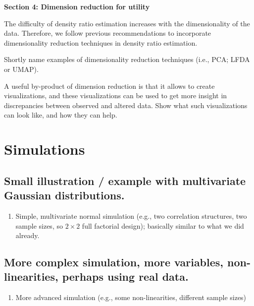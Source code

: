 \documentclass[
]{article}
\providecommand{\tightlist}{%
  \setlength{\itemsep}{0pt}\setlength{\parskip}{0pt}}\usepackage{longtable,booktabs,array}
\begin{document}
\textbf{Section 4: Dimension reduction for utility}

The difficulty of density ratio estimation increases with the
dimensionality of the data. Therefore, we follow previous
recommendations to incorporate dimensionality reduction techniques in
density ratio estimation.

Shortly name examples of dimensionality reduction techniques (i.e., PCA;
LFDA or UMAP).

A useful by-product of dimension reduction is that it allows to create
visualizations, and these visualizations can be used to get more insight
in discrepancies between observed and altered data. Show what such
visualizations can look like, and how they can help.

\hypertarget{simulations}{%
\section{Simulations}\label{simulations}}

\hypertarget{small-illustration-example-with-multivariate-gaussian-distributions.}{%
\subsection{Small illustration / example with multivariate Gaussian
distributions.}\label{small-illustration-example-with-multivariate-gaussian-distributions.}}

\begin{enumerate}
\def\labelenumi{\arabic{enumi}.}
\tightlist
\item
  Simple, multivariate normal simulation (e.g., two correlation
  structures, two sample sizes, so \(2 \times 2\) full factorial
  design); basically similar to what we did already.
\end{enumerate}

\hypertarget{more-complex-simulation-more-variables-non-linearities-perhaps-using-real-data.}{%
\subsection{More complex simulation, more variables, non-linearities,
perhaps using real
data.}\label{more-complex-simulation-more-variables-non-linearities-perhaps-using-real-data.}}

\begin{enumerate}
\def\labelenumi{\arabic{enumi}.}
\setcounter{enumi}{1}
\tightlist
\item
  More advanced simulation (e.g., some non-linearities, different sample
  sizes)
\end{enumerate}
\end{document}
